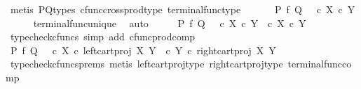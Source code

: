 \begin{isabellebody}
\ {\isacharparenleft}{\kern0pt}metis\ P{\isacharunderscore}{\kern0pt}Q{\isacharunderscore}{\kern0pt}types\ cfunc{\isacharunderscore}{\kern0pt}cross{\isacharunderscore}{\kern0pt}prod{\isacharunderscore}{\kern0pt}type\ terminal{\isacharunderscore}{\kern0pt}func{\isacharunderscore}{\kern0pt}type{\isacharparenright}{\kern0pt}\ \isanewline
\ \ \isamarkupfalse%
\ \isamarkupfalse%
\ {\isachardoublequoteopen}P\ {\isasymtimes}\isactrlsub f\ Q\ {\isacharequal}{\kern0pt}\ {\isasymlangle}{\isasymf}{\isacharcomma}{\kern0pt}{\isasymf}{\isasymrangle}\ {\isasymcirc}\isactrlsub c\ {\isasymbeta}\isactrlbsub X\ {\isasymtimes}\isactrlsub c\ Y\isactrlesub {\isachardoublequoteclose}\isanewline
\ \ \ \ \isamarkupfalse%
\ terminal{\isacharunderscore}{\kern0pt}func{\isacharunderscore}{\kern0pt}unique\ \isamarkupfalse%
\ auto\isanewline
\ \ \isamarkupfalse%
\ \isamarkupfalse%
\ {\isachardoublequoteopen}P\ {\isasymtimes}\isactrlsub f\ Q\ {\isacharequal}{\kern0pt}\ {\isasymlangle}{\isasymf}\ {\isasymcirc}\isactrlsub c\ {\isasymbeta}\isactrlbsub X\ {\isasymtimes}\isactrlsub c\ Y\isactrlesub {\isacharcomma}{\kern0pt}\ {\isasymf}\ {\isasymcirc}\isactrlsub c\ {\isasymbeta}\isactrlbsub X\ {\isasymtimes}\isactrlsub c\ Y\isactrlesub {\isasymrangle}{\isachardoublequoteclose}\isanewline
\ \ \ \ \isamarkupfalse%
\ {\isacharparenleft}{\kern0pt}typecheck{\isacharunderscore}{\kern0pt}cfuncs{\isacharcomma}{\kern0pt}\ simp\ add{\isacharcolon}{\kern0pt}\ cfunc{\isacharunderscore}{\kern0pt}prod{\isacharunderscore}{\kern0pt}comp{\isacharparenright}{\kern0pt}\isanewline
\ \ \isamarkupfalse%
\ \isamarkupfalse%
\ {\isachardoublequoteopen}P\ {\isasymtimes}\isactrlsub f\ Q\ {\isacharequal}{\kern0pt}\ {\isasymlangle}{\isasymf}\ {\isasymcirc}\isactrlsub c\ {\isasymbeta}\isactrlbsub X\isactrlesub \ {\isasymcirc}\isactrlsub c\ left{\isacharunderscore}{\kern0pt}cart{\isacharunderscore}{\kern0pt}proj\ X\ Y{\isacharcomma}{\kern0pt}\ {\isasymf}\ {\isasymcirc}\isactrlsub c\ {\isasymbeta}\isactrlbsub Y\isactrlesub \ {\isasymcirc}\isactrlsub c\ right{\isacharunderscore}{\kern0pt}cart{\isacharunderscore}{\kern0pt}proj\ X\ Y{\isasymrangle}{\isachardoublequoteclose}\isanewline
\ \ \ \ \isamarkupfalse%
\ {\isacharparenleft}{\kern0pt}typecheck{\isacharunderscore}{\kern0pt}cfuncs{\isacharunderscore}{\kern0pt}prems{\isacharcomma}{\kern0pt}\ metis\ left{\isacharunderscore}{\kern0pt}cart{\isacharunderscore}{\kern0pt}proj{\isacharunderscore}{\kern0pt}type\ right{\isacharunderscore}{\kern0pt}cart{\isacharunderscore}{\kern0pt}proj{\isacharunderscore}{\kern0pt}type\ terminal{\isacharunderscore}{\kern0pt}func{\isacharunderscore}{\kern0pt}comp{\isacharparenright}{\kern0pt}\isanewline

\end{isabellebody}
